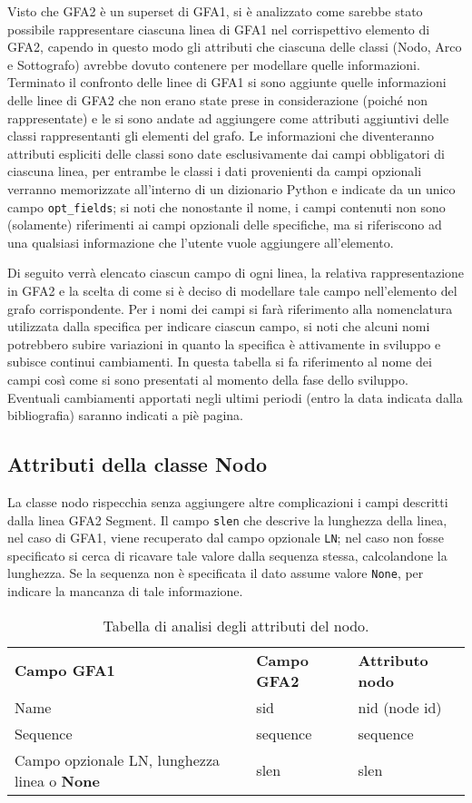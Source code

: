 Visto che GFA2 è un superset di GFA1, si è analizzato come sarebbe stato
possibile rappresentare ciascuna linea di GFA1 nel corrispettivo elemento
di GFA2, capendo in questo modo gli attributi che ciascuna delle classi (Nodo, Arco
e Sottografo) avrebbe dovuto contenere per modellare quelle informazioni.
Terminato il confronto delle linee di GFA1 si sono aggiunte quelle
informazioni delle linee di GFA2 che non erano state prese in considerazione
(poiché non rappresentate) e le si sono andate ad aggiungere come attributi
aggiuntivi delle classi rappresentanti gli elementi del grafo.
Le informazioni che diventeranno attributi espliciti delle classi sono date
esclusivamente dai campi obbligatori di ciascuna linea, per entrambe le
classi i dati provenienti da campi opzionali verranno memorizzate
all'interno di un dizionario Python e indicate da un unico campo
\texttt{opt\_fields}; si noti che nonostante il nome, i campi contenuti
non sono (solamente) riferimenti ai campi opzionali delle specifiche,
ma si riferiscono ad una qualsiasi informazione
che l'utente vuole aggiungere all'elemento.

Di seguito verrà elencato ciascun campo di ogni linea, la relativa rappresentazione
in GFA2 e la scelta di come si è deciso di modellare tale campo nell'elemento
del grafo corrispondente. Per i nomi dei campi si farà riferimento alla nomenclatura
utilizzata dalla specifica per indicare ciascun campo, si noti
che alcuni nomi potrebbero subire variazioni in quanto la specifica è attivamente
in sviluppo e subisce continui cambiamenti. In questa tabella si fa riferimento
al nome dei campi così come si sono presentati al momento della fase dello
sviluppo.
Eventuali cambiamenti apportati negli ultimi periodi (entro la data indicata
dalla bibliografia) saranno indicati a piè pagina.

\subsection{Attributi della classe Nodo}
La classe nodo rispecchia senza aggiungere altre complicazioni
i campi descritti dalla linea GFA2 Segment.
Il campo \texttt{slen} che descrive la lunghezza della linea, nel
caso di GFA1, viene recuperato dal campo opzionale \texttt{LN};
nel caso non fosse specificato si cerca di ricavare tale valore
dalla sequenza stessa, calcolandone la lunghezza. Se la
sequenza non è specificata il dato assume valore \texttt{None}, per
indicare la mancanza di tale informazione.
\noindent
\begin{table}[h]
	\begin{tabularx}{\textwidth}{ | X | X | X |}
		\hline
		\textbf{Campo GFA1}	&	\textbf{Campo GFA2}	&	\textbf{Attributo nodo}\\
		Name				&	sid					&	nid (node id)\\
		Sequence				&	sequence				&	sequence\\
		Campo opzionale LN, lunghezza linea o \mbox{\textbf{None}}	&	slen	& slen\\
		\hline
	\end{tabularx}
	\caption{Tabella di analisi degli attributi del nodo.}
	\label{tab:node-analysis}
\end{table}


